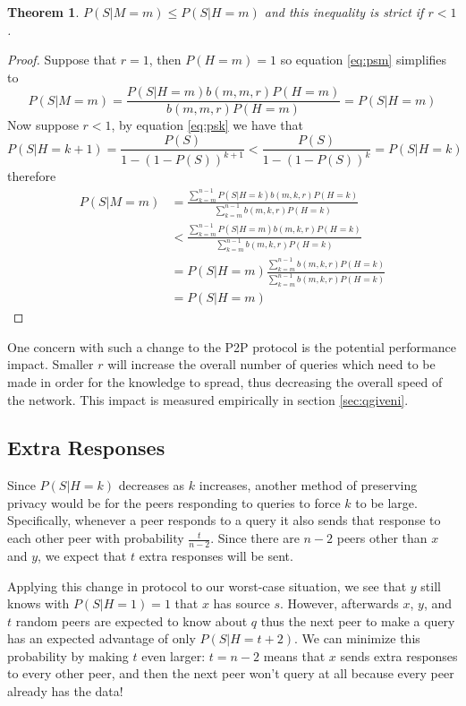 \documentclass{article}
\newcommand{\eqnref}[1]{equation \eqref{eq:#1}}
\newcommand{\secref}[1]{section \ref{sec:#1}}
\newtheorem{theorem}{Theorem}
\begin{document}
\begin{theorem}\label{th:rbound}
	$P(S|M=m)\le P(S|H=m)$ and this inequality is strict if $r<1$.
\end{theorem}
\begin{proof}
	Suppose that $r=1$, then $P(H=m)=1$ so \eqnref{psm} simplifies to
	\begin{equation*}
		P(S|M=m)=\frac{P(S|H=m)b(m,m,r)P(H=m)}{b(m,m,r)P(H=m)}=P(S|H=m)
	\end{equation*}
	Now suppose $r<1$, by \eqnref{psk} we have that
	\begin{equation*}
		P(S|H=k+1)=\frac{P(S)}{1-(1-P(S))^{k+1}}<\frac{P(S)}{1-(1-P(S))^k}=P(S|H=k)
	\end{equation*}
	therefore
	\begin{align*}
		P(S|M=m)&=\frac{\sum_{k=m}^{n-1}P(S|H=k)b(m,k,r)P(H=k)}{\sum_{k=m}^{n-1}b(m,k,r)P(H=k)}\\
		&<\frac{\sum_{k=m}^{n-1}P(S|H=m)b(m,k,r)P(H=k)}{\sum_{k=m}^{n-1}b(m,k,r)P(H=k)}\\
		&=P(S|H=m)\frac{\sum_{k=m}^{n-1}b(m,k,r)P(H=k)}{\sum_{k=m}^{n-1}b(m,k,r)P(H=k)}\\
		&=P(S|H=m)
	\end{align*}
\end{proof}

One concern with such a change to the P2P protocol is the potential performance
impact. Smaller $r$ will increase the overall number of queries which need to be
made in order for the knowledge to spread, thus decreasing the overall speed of
the network. This impact is measured empirically in \secref{qgiveni}.

\subsection{Extra Responses}\label{sec:exre}

Since $P(S|H=k)$ decreases as $k$ increases, another method of
preserving privacy would be for the peers responding to queries to force $k$ to
be large. Specifically, whenever a peer responds to a query it also
sends that response to each other peer with probability
$\frac{t}{n-2}$. Since there are $n-2$ peers other than $x$ and $y$, we expect
that $t$ extra responses will be sent.

Applying this change in protocol to our worst-case situation, we see that $y$
still knows with $P(S|H=1)=1$ that $x$ has source $s$. However, afterwards $x$,
$y$, and $t$ random peers are expected to know about $q$ thus the next peer
to make a query has an expected advantage of only $P(S|H=t+2)$. We can minimize this
probability by making $t$ even larger: $t=n-2$ means that $x$ sends extra
responses to every other peer, and then the next peer won't query at all because
every peer already has the data!
\end{document}
